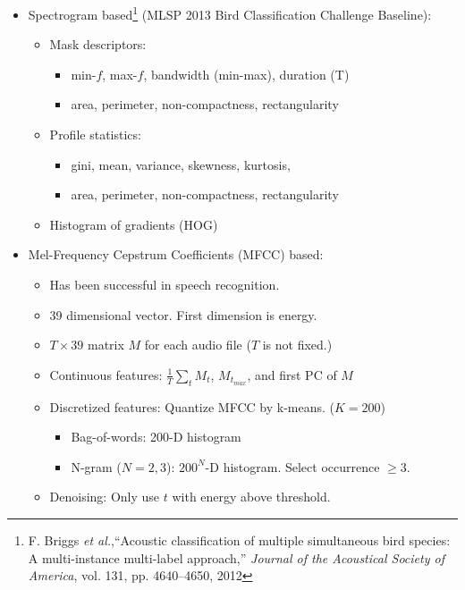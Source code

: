 \begin{itemize}
	\item Spectrogram based\footnote[1]{F. Briggs \emph{et al.},``Acoustic classification of multiple simultaneous bird species: A multi-instance multi-label approach,'' \emph{Journal of the Acoustical Society of America}, vol. 131, pp. 4640--4650, 2012} (MLSP 2013 Bird Classification Challenge Baseline):
	\begin{itemize}
		\item Mask descriptors: 
		\begin{itemize}
			\item min-$f$, max-$f$, bandwidth (min-max), duration (T)
			\item area, perimeter, non-compactness, rectangularity		
		\end{itemize}
		\item Profile statistics:
		\begin{itemize}
			\item gini, mean, variance, skewness, kurtosis, 
			\item area, perimeter, non-compactness, rectangularity		
		\end{itemize}
		\item Histogram of gradients (HOG)
	\end{itemize}
	\item Mel-Frequency Cepstrum Coefficients (MFCC) based: 
	\begin{itemize}
		\item Has been successful in speech recognition.
		\item 39 dimensional vector. First dimension is energy.
		\item $ T \times 39$ matrix $M$ for each audio file ($T$ is not fixed.)
		\item Continuous features: $\frac{1}{T}\sum_t M_t$, $M_{t_{max}}$, and first PC of $M$
		\item Discretized features: Quantize MFCC by k-means. ($K=200$)
		\begin{itemize}
			\item Bag-of-words: 200-D histogram
			\item N-gram ($N=2,3$): $200^N$-D histogram. Select occurrence $\geq 3$. 
		\end{itemize}
		\item Denoising: Only use $t$ with energy above threshold.	
	\end{itemize}
\end{itemize}